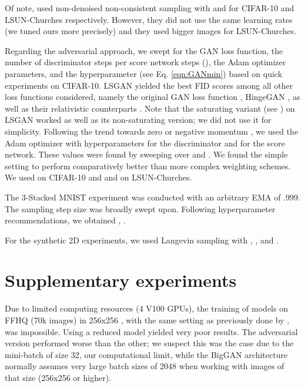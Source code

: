 \documentclass{article} \usepackage{iclr2021_conference_notitle,times}
\theoremstyle{definition}
\theoremstyle{definition}
\begin{document}
Of note, \citet{song2020improved} used non-denoised non-consistent sampling with  and  for CIFAR-10 and LSUN-Churches respectively. However, they did not use the same learning rates (we tuned ours more precisely) and they used bigger images for LSUN-Churches.

Regarding the adversarial approach, we swept for the GAN loss function, the number of discriminator steps per score network steps (), the Adam optimizer \citep{Adam} parameters, and the hyperparameter  (see Eq. \ref{eqn:GANmin}) based on quick experiments on CIFAR-10. LSGAN \citep{LSGAN} yielded the best FID scores among all other loss functions considered, namely the original GAN loss function \citep{GAN}, HingeGAN \citep{lim2017geometric}, as well as their relativistic counterparts \citep{jolicoeur2018relativistic,jolicoeur2019relativistic}. Note that the saturating variant (see \citet{GAN}) on LSGAN worked as well as its non-saturating version; we did not use it for simplicity. Following the trend towards zero or negative momentum \citep{gidel2019negative}, we used the Adam optimizer with hyperparameters  for the discriminator and  for the score network. These values were found by sweeping over  and . We found the simple setting  to perform comparatively better than more complex weighting schemes. We used  on CIFAR-10 and and  on LSUN-Churches.

The 3-Stacked MNIST experiment was conducted with an arbitrary EMA of .999. The sampling step size was broadly swept upon. Following \citep{song2020improved} hyperparameter recommendations, we obtained , .

For the synthetic 2D experiments, we used Langevin sampling with , , and .

\section{Supplementary experiments}
\label{app:B}

Due to limited computing resources (4 V100 GPUs), the training of models on FFHQ (70k images) in 256x256 \citep{karras2019style}, with the same setting as previously done by \citet{song2020improved}, was impossible. Using a reduced model yielded very poor results. The adversarial version performed worse than the other; we suspect this was the case due to the mini-batch of size 32, our computational limit, while the BigGAN architecture normally assumes very large batch sizes of 2048 when working with images of that size (256x256 or higher). 
\end{document}
